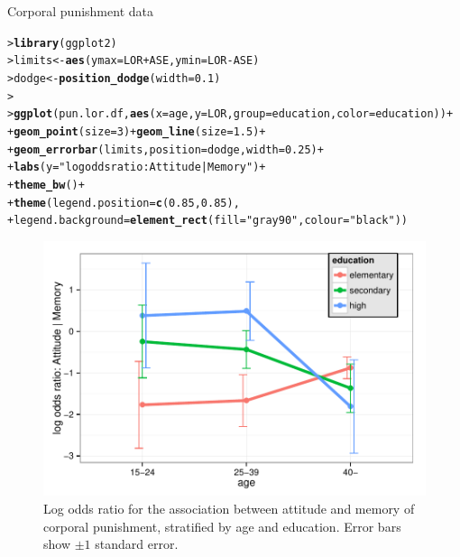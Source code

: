 \documentclass[10pt,krantz2]{krantz}\usepackage[]{graphicx}\usepackage[]{color}
\makeatletter
\newcommand{\hlnum}[1]{\textcolor[rgb]{0.686,0.059,0.569}{#1}}%
\newcommand{\hlstr}[1]{\textcolor[rgb]{0.192,0.494,0.8}{#1}}%
\newcommand{\hlopt}[1]{\textcolor[rgb]{0,0,0}{#1}}%
\newcommand{\hlstd}[1]{\textcolor[rgb]{0.345,0.345,0.345}{#1}}%
\newcommand{\hlkwb}[1]{\textcolor[rgb]{0.69,0.353,0.396}{#1}}%
\newcommand{\hlkwc}[1]{\textcolor[rgb]{0.333,0.667,0.333}{#1}}%
\newcommand{\hlkwd}[1]{\textcolor[rgb]{0.737,0.353,0.396}{\textbf{#1}}}%
\newenvironment{kframe}{%
 \def\at@end@of@kframe{}%
 \ifinner\ifhmode%
  \def\at@end@of@kframe{\end{minipage}}%
  \begin{minipage}{\columnwidth}%
 \fi\fi%
 \def\FrameCommand##1{\hskip\@totalleftmargin \hskip-\fboxsep
 \colorbox{shadecolor}{##1}\hskip-\fboxsep
     \hskip-\linewidth \hskip-\@totalleftmargin \hskip\columnwidth}%
 \MakeFramed {\advance\hsize-\width
   \@totalleftmargin\z@ \linewidth\hsize
   \@setminipage}}%
 {\par\unskip\endMakeFramed%
 \at@end@of@kframe}
\newenvironment{knitrout}{}{} %
\renewenvironment{knitrout}{\small\renewcommand{\baselinestretch}{.85}}{} %
\makeatother
\begin{document}
\begin{Example}[punish2]{Corporal punishment data}
\begin{knitrout}
\color{fgcolor}\begin{kframe}
\begin{alltt}
\hlstd{> }\hlkwd{library}\hlstd{(ggplot2)}
\hlstd{> }\hlstd{limits} \hlkwb{<-} \hlkwd{aes}\hlstd{(}\hlkwc{ymax} \hlstd{= LOR} \hlopt{+} \hlstd{ASE,} \hlkwc{ymin}\hlstd{=LOR} \hlopt{-} \hlstd{ASE)}
\hlstd{> }\hlstd{dodge} \hlkwb{<-} \hlkwd{position_dodge}\hlstd{(}\hlkwc{width}\hlstd{=}\hlnum{0.1}\hlstd{)}
\hlstd{> }
\hlstd{> }\hlkwd{ggplot}\hlstd{(pun.lor.df,} \hlkwd{aes}\hlstd{(}\hlkwc{x}\hlstd{=age,} \hlkwc{y}\hlstd{=LOR,} \hlkwc{group}\hlstd{=education,} \hlkwc{color}\hlstd{=education))} \hlopt{+}
\hlstd{+ }  \hlkwd{geom_point}\hlstd{(}\hlkwc{size}\hlstd{=}\hlnum{3}\hlstd{)} \hlopt{+} \hlkwd{geom_line}\hlstd{(}\hlkwc{size}\hlstd{=}\hlnum{1.5}\hlstd{)} \hlopt{+}
\hlstd{+ }  \hlkwd{geom_errorbar}\hlstd{(limits,} \hlkwc{position}\hlstd{=dodge,} \hlkwc{width}\hlstd{=}\hlnum{0.25}\hlstd{)} \hlopt{+}
\hlstd{+ }  \hlkwd{labs}\hlstd{(}\hlkwc{y}\hlstd{=}\hlstr{"log odds ratio: Attitude | Memory"}\hlstd{)} \hlopt{+}
\hlstd{+ }  \hlkwd{theme_bw}\hlstd{()} \hlopt{+}
\hlstd{+ }  \hlkwd{theme}\hlstd{(}\hlkwc{legend.position} \hlstd{=} \hlkwd{c}\hlstd{(}\hlnum{0.85}\hlstd{,} \hlnum{0.85}\hlstd{),}
\hlstd{+ }        \hlkwc{legend.background} \hlstd{=} \hlkwd{element_rect}\hlstd{(}\hlkwc{fill} \hlstd{=} \hlstr{"gray90"}\hlstd{,} \hlkwc{colour} \hlstd{=} \hlstr{"black"}\hlstd{))}
\end{alltt}
\end{kframe}\begin{figure}[!htbp]

\centerline{\includegraphics[width=.8\textwidth]{ch05/fig/pun-lor-plot-1} }

\caption[Log odds ratio for the association between attitude and memory of corporal punishment, stratified by age and education]{Log odds ratio for the association between attitude and memory of corporal punishment, stratified by age and education. Error bars show $\pm 1$ standard error.\label{fig:pun-lor-plot}}
\end{figure}



\end{knitrout}
\end{Example}
\end{document}
